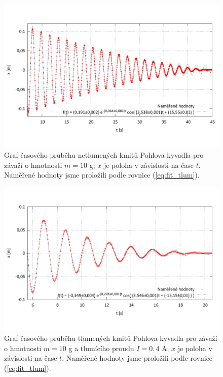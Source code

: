 \documentclass[english]{article}
\begin{document}
	\begin{figure}[h]
	\begin{center}
	\vspace*{-1cm}
		\includegraphics[width=\linewidth]{../gnuplot/10_pohl_tlum_10g_2.pdf}
	\vspace*{-2cm}
			\caption{Graf časového průběhu netlumených kmitů Pohlova kyvadla pro závaží o hmotnosti $m=10$ g; $x$ je poloha v závislosti na čase $t$. Naměřené hodnoty jsme proložili podle rovnice (\ref{eq:fit_tlum}).}
			\label{fig:pohl_tlum_10g}
	\end{center}
	\end{figure}

	\begin{figure}[h!]
	\begin{center}
	\vspace*{-1cm}
		\includegraphics[width=\linewidth]{../gnuplot/10_pohl_dekr_04_10g.pdf}
	\vspace*{-2cm}
			\caption{Graf časového průběhu tlumených kmitů Pohlova kyvadla pro závaží o hmotnosti $m=10$ g a tlumícího proudu $I = 0,4$ A; $x$ je poloha v závislosti na čase $t$. Naměřené hodnoty jsme proložili podle rovnice (\ref{eq:fit_tlum}).}
			\label{fig:pohl_dekr_04}
	\end{center}
	\end{figure}
\end{document}
